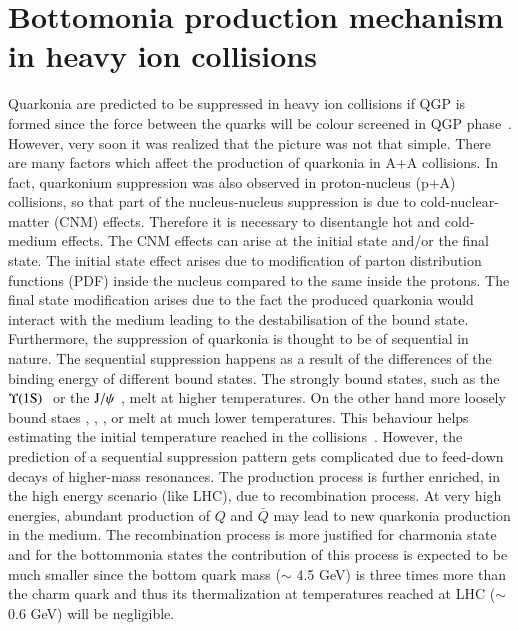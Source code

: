 \section{Bottomonia production mechanism in heavy ion collisions}
\label{sec:Bottomonia_hi}

Quarkonia are predicted to be suppressed in heavy ion collisions
if QGP is formed since the force between the quarks will be colour screened
in QGP phase~\cite{Matsui:1986dk}.
 However, very soon it was realized that the picture was not that simple.
There are many factors which affect the production of quarkonia in A+A collisions. 
In fact, quarkonium suppression was also observed in proton-nucleus (p+A)
collisions, so that part of the nucleus-nucleus suppression is due to 
cold-nuclear-matter (CNM) effects. Therefore it is necessary to disentangle hot 
and cold-medium effects. The CNM effects can arise at the initial
state and/or the final state. The initial state effect
arises due to modification of parton distribution functions (PDF) inside the nucleus
compared to the same inside the protons. The final state modification 
arises due to the  fact the produced quarkonia would interact with the medium
leading to the destabilisation of the bound state. Furthermore, the suppression of
quarkonia is thought to be of sequential in nature.  The sequential suppression
happens as a result of the differences of the  binding energy of different bound states. 
The strongly bound states, such as the $\Upsilon\mathrm{(1S)}\hspace {0.05in}$ or the $\mathrm{J}/\psi\hspace {0.05in}$,  melt at higher 
temperatures. On the other hand  more loosely bound staes \psiP, \chic, \chib, 
\upsb or \upsc  melt at much lower temperatures.  This behaviour helps  
 estimating the initial temperature reached in 
the collisions~\cite{Digal:2001ue}. However, the prediction of a sequential 
suppression pattern gets complicated due to feed-down 
decays of higher-mass resonances. The production process is further 
enriched, in the high energy scenario (like LHC), due to recombination process. At very 
high energies, abundant production of $Q$ and $\bar Q$ may lead to new quarkonia production 
in the medium. The recombination process is more justified for charmonia state and 
for the bottommonia states the contribution of this process is expected to be much
smaller since the bottom quark mass ($\sim$ 4.5 GeV) is three times more than the
charm quark and thus its thermalization at temperatures reached at LHC
($\sim$ 0.6 GeV) will be negligible. 





